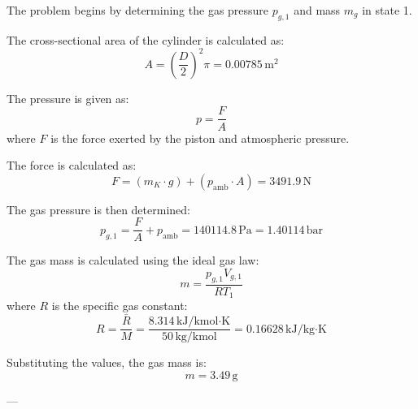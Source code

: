 The problem begins by determining the gas pressure \( p_{g,1} \) and mass \( m_g \) in state 1.  

The cross-sectional area of the cylinder is calculated as:  
\[
A = \left(\frac{D}{2}\right)^2 \pi = 0.00785 \, \text{m}^2
\]  

The pressure is given as:  
\[
p = \frac{F}{A}
\]  
where \( F \) is the force exerted by the piston and atmospheric pressure.  

The force is calculated as:  
\[
F = (m_K \cdot g) + (p_{\text{amb}} \cdot A) = 3491.9 \, \text{N}
\]  

The gas pressure is then determined:  
\[
p_{g,1} = \frac{F}{A} + p_{\text{amb}} = 140114.8 \, \text{Pa} = 1.40114 \, \text{bar}
\]  

The gas mass is calculated using the ideal gas law:  
\[
m = \frac{p_{g,1} V_{g,1}}{R T_1}
\]  
where \( R \) is the specific gas constant:  
\[
R = \frac{\bar{R}}{M} = \frac{8.314 \, \text{kJ/kmol·K}}{50 \, \text{kg/kmol}} = 0.16628 \, \text{kJ/kg·K}
\]  

Substituting the values, the gas mass is:  
\[
m = 3.49 \, \text{g}
\]  

---